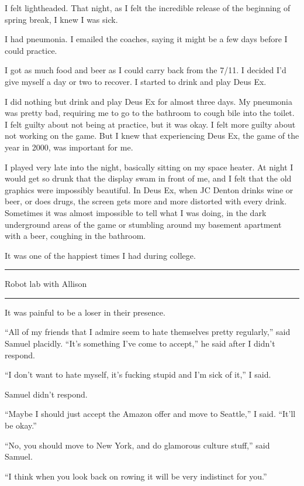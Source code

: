 I felt lightheaded.  That night, as I felt the incredible release of the
beginning of spring break, I knew I was sick.  

I had pneumonia.  I emailed the coaches, saying it might be a few days before I
could practice.

I got as much food and beer as I could carry back from the 7/11.  I decided I'd
give myself a day or two to recover.  I started to drink and play Deus Ex.  

I did nothing but drink and play Deus Ex for almost three days.  My pneumonia
was pretty bad, requiring me to go to the bathroom to cough bile into the
toilet.  I felt guilty about not being at practice, but it was okay.  I felt
more guilty about not working on the game.  But I knew that experiencing Deus
Ex, the game of the year in 2000, was important for me.

I played very late into the night, basically sitting on my space heater.  At
night I would get so drunk that the display swam in front of me, and I felt that
the old graphics were impossibly beautiful.  In Deus Ex, when JC Denton drinks
wine or beer, or does drugs, the screen gets more and more distorted with every
drink.  Sometimes it was almost impossible to tell what I was doing, in the dark
underground areas of the game or stumbling around my basement apartment with a
beer, coughing in the bathroom.

It was one of the happiest times I had during college.

\plainfancybreak{12pt}{2}{* * *}

Robot lab with Allison

\plainfancybreak{12pt}{2}{* * *}

It was painful to be a loser in their presence.  

``All of my friends that I admire seem to hate themselves pretty regularly,''
said Samuel placidly.  ``It's something I've come to accept,'' he said after I
didn't respond.

``I don't want to hate myself, it's fucking stupid and I'm sick of it,'' I said.  

Samuel didn't respond.

``Maybe I should just accept the Amazon offer and move to Seattle,'' I said.
``It'll be okay.''

``No, you should move to New York, and do glamorous culture stuff,'' said
Samuel.

``I think when you look back on rowing it will be very indistinct for you.'' 

